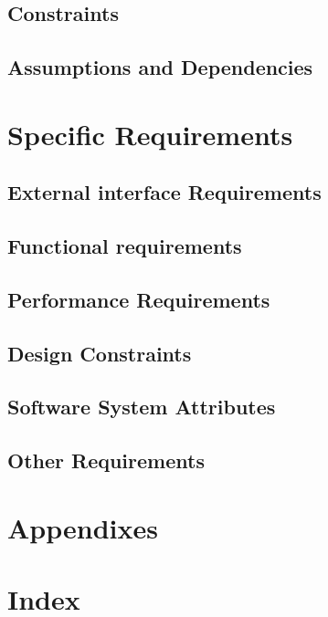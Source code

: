 \documentclass[12pt]{article}
\begin{document}
	\subsection{Constraints}
	\subsection{Assumptions and Dependencies}
	\section{Specific Requirements}
	\subsection{External interface Requirements}
	\subsection{Functional requirements}
	\subsection{Performance Requirements}
	
	\subsection{Design Constraints}
	\subsection{Software System Attributes}
	\subsection{Other Requirements}
	\section{Appendixes}
	\section{Index}
\end{document}

